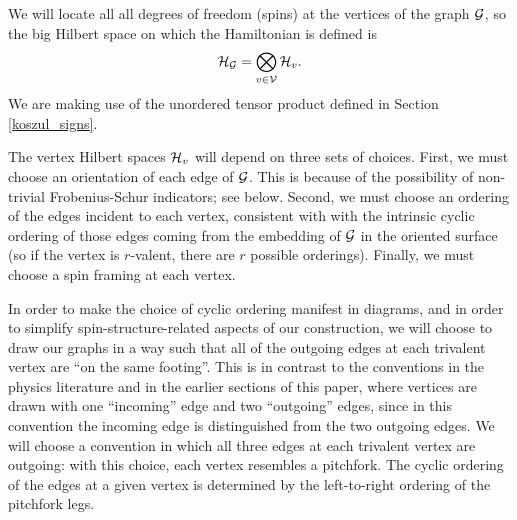 We will locate all all degrees of freedom (spins) at the vertices of the graph $\mathcal{G}$, so
the big Hilbert space on which the Hamiltonian is defined is
\begin{align}	\label{GraphHilbertSpace}
 \mch_\mcg =\bigotimes_{v \in \mcv} \mch_v.  %
\end{align}
We are making use of the unordered tensor product defined in Section \ref{koszul_signs}.

The vertex Hilbert spaces $\mathcal{H}_{v}$ will depend on three sets of choices.
First, we must choose an orientation of each edge of $\mathcal{G}$.
This is because of the possibility of non-trivial Frobenius-Schur indicators; see below.
Second, we must choose an ordering of the edges incident to each vertex, consistent with with the intrinsic cyclic ordering of those edges
coming from the embedding of $\mathcal{G}$ in the oriented surface
(so if the vertex is $r$-valent, there are $r$ possible orderings).
Finally, we must choose a spin framing at each vertex.

In order to make the choice of cyclic ordering manifest in diagrams, and in order to simplify spin-structure-related
aspects of our construction, we will choose to draw our graphs in a way such that all of the outgoing 
edges at each trivalent vertex are ``on the same footing''. This is in contrast to the conventions in the physics literature
and in the earlier sections of this paper, where vertices are drawn with one ``incoming'' edge and two 
``outgoing'' edges, since in this convention the incoming edge is distinguished from the two outgoing edges.
We will choose a convention in which all three edges at each trivalent vertex are outgoing: with this
choice, each vertex resembles a pitchfork. 
The cyclic ordering of the edges at a given vertex is determined by the left-to-right ordering of the pitchfork legs. 

